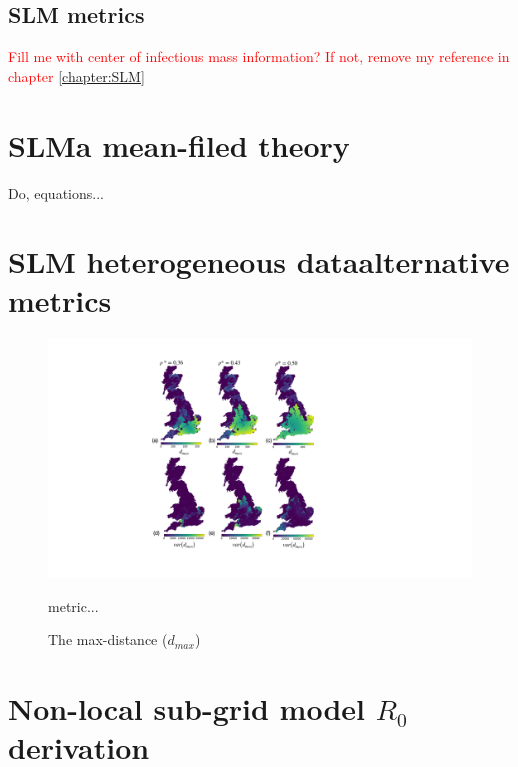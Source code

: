 \section{SLM metrics}
\label{a:slm_metrics}

\textcolor{red}{Fill me with center of infectious mass information? If not, remove my reference in chapter \ref{chapter:SLM}}

\chapter{SLM\textemdash a mean-filed theory}

\label{a:slm-mean-field-theory}

Do, equations...
\blindtext

\chapter{SLM heterogeneous data\textemdash alternative metrics}
\label{a:slm_heterogeneous}

\begin{figure}
    \centering
    \includegraphics[scale=0.55]{appendix/figures/A-ch4figure1.pdf}
    \caption{The max-distance ($d_{max}$)} metric...
    \label{fig:my_label}
\end{figure}

\blindtext
\blindtext

\chapter{Non-local sub-grid model $R_0$ derivation}
\label{section:apendix_A}

